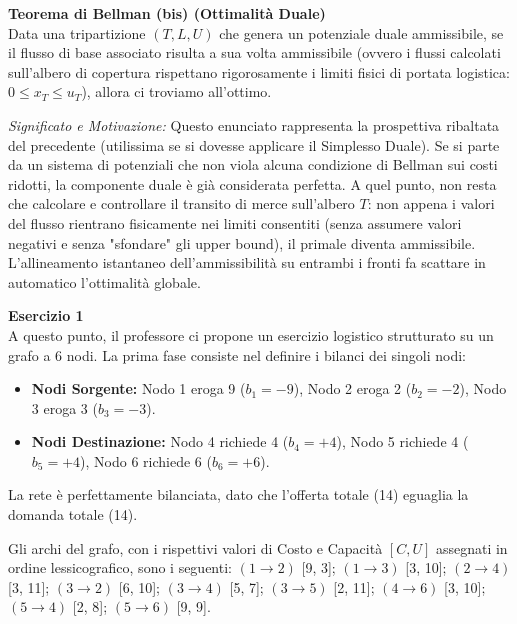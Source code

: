 \documentclass[12pt, a4paper]{article}
\newcommand{\separatore}{\noindent{\color{titlecolor!50}\rule{\textwidth}{0.6pt}}}
\begin{document}
	\vspace{0.4cm}
	\textbf{Teorema di Bellman (bis) (Ottimalità Duale)}\\
	Data una tripartizione $(T, L, U)$ che genera un potenziale duale ammissibile, se il flusso di base associato risulta a sua volta ammissibile (ovvero i flussi calcolati sull'albero di copertura rispettano rigorosamente i limiti fisici di portata logistica: $0 \le x_T \le u_T$), allora ci troviamo all'ottimo.
	
	\textit{Significato e Motivazione:} Questo enunciato rappresenta la prospettiva ribaltata del precedente (utilissima se si dovesse applicare il Simplesso Duale). Se si parte da un sistema di potenziali che non viola alcuna condizione di Bellman sui costi ridotti, la componente duale è già considerata perfetta. A quel punto, non resta che calcolare e controllare il transito di merce sull'albero $T$: non appena i valori del flusso rientrano fisicamente nei limiti consentiti (senza assumere valori negativi e senza "sfondare" gli upper bound), il primale diventa ammissibile. L'allineamento istantaneo dell'ammissibilità su entrambi i fronti fa scattare in automatico l'ottimalità globale.
	
	\vspace{0.6cm}
	\separatore
	\vspace{0.4cm}
	
	\textbf{Esercizio 1}\\
	A questo punto, il professore ci propone un esercizio logistico strutturato su un grafo a 6 nodi. La prima fase consiste nel definire i bilanci dei singoli nodi:
	\begin{itemize}[label=\textcolor{titlecolor}{\Large\textbullet}, itemsep=2pt, leftmargin=1.5cm]
		\item \textbf{Nodi Sorgente:} Nodo 1 eroga 9 ($b_1 = -9$), Nodo 2 eroga 2 ($b_2 = -2$), Nodo 3 eroga 3 ($b_3 = -3$).
		\item \textbf{Nodi Destinazione:} Nodo 4 richiede 4 ($b_4 = +4$), Nodo 5 richiede 4 ($b_5 = +4$), Nodo 6 richiede 6 ($b_6 = +6$).
	\end{itemize}
	La rete è perfettamente bilanciata, dato che l'offerta totale (14) eguaglia la domanda totale (14).
	
	Gli archi del grafo, con i rispettivi valori di Costo e Capacità $[C, U]$ assegnati in ordine lessicografico, sono i seguenti: 
	$(1\to2)$ [9, 3]; $(1\to3)$ [3, 10]; $(2\to4)$ [3, 11]; $(3\to2)$ [6, 10]; $(3\to4)$ [5, 7]; $(3\to5)$ [2, 11]; $(4\to6)$ [3, 10]; $(5\to4)$ [2, 8]; $(5\to6)$ [9, 9].
	
\end{document}
